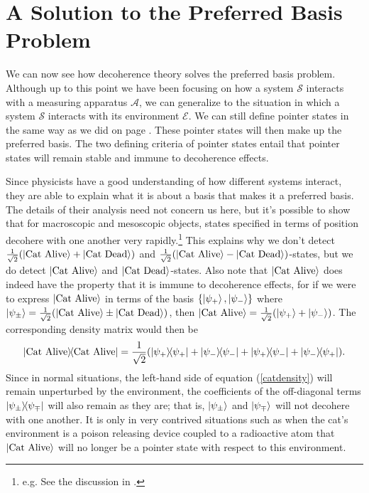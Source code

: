 
\section{\label{sectionPreferredBasis}A Solution to the Preferred Basis Problem\protect\footnotemark}
We can now see how decoherence theory solves the preferred basis problem. Although up to this point we have been focusing on how a system $\mathcal{S}$ interacts with a measuring apparatus $\mathcal{A}$, we can generalize to the situation in which a system $\mathcal{S}$ interacts with its environment $\mathcal{E}$. We can still define pointer states in the same way as we did on page \pageref{pointer}. These pointer states will then make up the preferred basis. The two defining criteria of pointer states entail that pointer states will remain stable and immune to decoherence effects. 

Since physicists have a good understanding of how different systems interact, they are able to explain what it is about a basis that makes it a preferred basis.  The details of their analysis need not concern us here, but it's possible to show that for macroscopic and mesoscopic objects, states specified in terms of position decohere with one another very rapidly.\footnote{e.g. See the discussion in \cite[94]{Schlosshauer}.} This explains why we don't detect $\frac{1}{\sqrt{2}}(\ket{\text{Cat Alive}}+\ket{\text{Cat Dead}})$ and $\frac{1}{\sqrt{2}}(\ket{\text{Cat Alive}}-\ket{\text{Cat Dead}})$-states, but we do detect $\ket{\text{Cat Alive}}$ and $\ket{\text{Cat Dead}}$-states. Also note that $\ket{\text{Cat Alive}}$  does indeed have the property that it is immune to decoherence effects, for if we were to express $\ket{\text{Cat Alive}}$ in terms of the basis $\{\ket{\psi_+},\ket{\psi_-} \}$ where $\ket{\psi_\pm}=\frac{1}{\sqrt{2}}(\ket{\text{Cat Alive}}\pm\ket{\text{Cat Dead}})$, then $\ket{\text{Cat Alive}}=\frac{1}{\sqrt{2}}(\ket{\psi_+}+\ket{\psi_-})$. The corresponding density matrix would then be 
\begin{equation}\label{catdensity}\dyad{\text{Cat Alive}}=\frac{1}{\sqrt{2}}(\dyad{\psi_+}+\dyad{\psi_-}+\dyad{\psi_+}{\psi_-}+\dyad{\psi_-}{\psi_+}).
\end{equation} Since in normal situations, the left-hand side of equation (\ref{catdensity}) will remain unperturbed by the environment, the coefficients of the off-diagonal terms $\dyad{\psi_\pm}{\psi_\mp}$ will also remain as they are; that is, $\ket{\psi_\pm}$ and $\ket{\psi_\mp}$ will not decohere with one another. It is only in very contrived situations such as when the cat's environment is a poison releasing device coupled to a radioactive atom that $\ket{\text{Cat Alive}}$ will no longer be a pointer state with respect to this environment.
